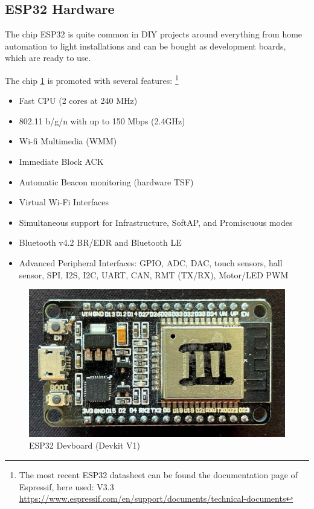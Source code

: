 \subsection*{ESP32 Hardware}

The chip ESP32 is quite common in DIY projects around everything from home automation to light installations 
and can be bought as development boards, which are ready to use.

The chip \ref{fig:esp32} is promoted with several features: 
\footnote{The most recent ESP32 datasheet can be found the documentation page of Espressif, here used: V3.3\\
	\url{https://www.espressif.com/en/support/documents/technical-documents}}
\begin{itemize}
	\setlength\itemsep{-0.0em}
	\item Fast CPU (2 cores at 240 MHz)
	\item 802.11 b/g/n with up to 150 Mbps (2.4GHz)
	\item Wi-fi Multimedia (WMM)
	\item Immediate Block ACK
	\item Automatic Beacon monitoring (hardware TSF)
	\item Virtual Wi-Fi Interfaces
	\item Simultaneous support for Infrastructure, SoftAP, and Promiscuous modes
	\item Bluetooth v4.2 BR/EDR and Bluetooth LE
	\item Advanced Peripheral Interfaces: GPIO, ADC, DAC, touch sensors, hall sensor, 
	SPI, I2S, I2C, UART, CAN, RMT (TX/RX), Motor/LED PWM 
\end{itemize}

\begin{figure}[h]
	\centering
	\includegraphics[scale=0.2]{figures/espdevboard.jpg}
	\caption{ESP32 Devboard (Devkit V1)}
	\label{fig:esp32}%
\end{figure}

